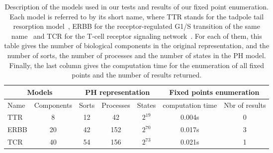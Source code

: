\begin{table}[ht]
\begin{center}
\noindent%
\begin{tabular}{|l|c||c|c|c||c|c|}
\hline
  \multicolumn{2}{|c||}{Models} & \multicolumn{3}{c||}{PH representation} & \multicolumn{2}{c|}{Fixed points enumeration} \\
\hline
  Name & Components & Sorts & Processes & States & computation time & Nbr of results \\
\hline
\hline
  TTR  & 8  & 12 & 42  & $2^{19}$ & 0.004s & 0 \\
\hline
  ERBB & 20 & 42 & 152 & $2^{70}$ & 0.017s & 3 \\
\hline
  TCR  & 40 & 54 & 156 & $2^{73}$ & 0.021s & 1 \\
\hline
\end{tabular}
\caption{\label{tab:models}%
Description of the models used in our tests and results of our fixed point enumeration.
Each model is referred to by its short name, where
TTR stands for the tadpole tail resorption model~\cite{khalis2009smbionet},
ERBB for the receptor-regulated G1/S transition of the same name~\cite{Samaga2009}
and TCR for the T-cell receptor signaling network~\cite{Klamt06}.
For each of them, this table gives the number of biological components
in the original representation,
and the number of sorts, the number of processes
and the number of states in the PH model.
Finally, the last column gives the computation time for the enumeration of all fixed points
and the number of results returned.
}
\end{center}
\end{table}

